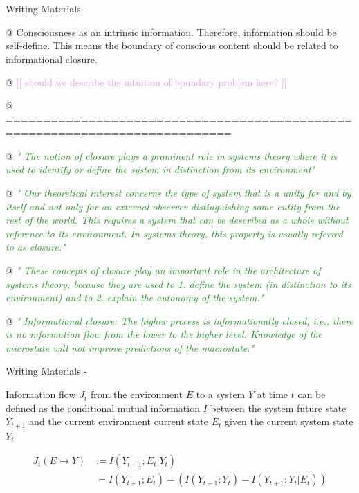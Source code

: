 \documentclass[utf8]{article}
\newenvironment{WritingMaterials} %
    	{
            \begin{tcolorbox}[enhanced,
                title=-,
                size=small,
                colbacktitle=Aquamarine,
                drop fuzzy shadow,
                fontupper=\small,
                boxrule=0.4pt,
                colback=Aquamarine!10!white,
                sharp corners]
                Writing Materials
            \end{tcolorbox}
            \begin{easylist}[itemize]
    	}
    	{
            \end{easylist}  
            \begin{tcolorbox}[enhanced,
                halign=flush right,
                halign title=right,
                size=small,
                colbacktitle=Aquamarine,
                drop fuzzy shadow,
                fontupper=\small,
                boxrule=0.4pt,
                colback=Aquamarine,
                colupper=White,
                sharp corners]
                Writing Materials -
            \end{tcolorbox}        
    	}
\newcommand{\rewrite}[1]{\textcolor{ForestGreen}{\textit{"#1"}}\newline}
\newcommand{\idea}[2][Plum]{\noindent
				\textcolor{#1}{[[ #2 ]]}}
\begin{document}
		\begin{WritingMaterials}
			@ Consciousness as an intrinsic information. Therefore, information should be self-define. This means the boundary of conscious content should be related to informational closure.

			@ \idea{should we describe the intuition of boundary problem here?}

			@ ============================================================================


			@ \rewrite{
				The notion of closure plays a prominent role in systems theory where it is used to identify or define the system in distinction from its environment} \cite{BERTSCHINGER.2006}

			@ \rewrite{
				Our theoretical interest concerns the type of system that is a unity for and by itself and not only for an external observer distinguishing some entity from the rest of the world. This requires a system that can be described as a whole without reference to its environment. In systems theory, this property is usually referred to as closure.}\citep{BERTSCHINGER.2006}

			@ \rewrite{
				These concepts of closure play an important role in the architecture of systems
				theory, because they are used to
				1. define the system (in distinction to its environment) and to
				2. explain the autonomy of the system.}\citep{BERTSCHINGER.2006}

			@ \rewrite{
				Informational closure: The higher process is informationally closed, i.e., there is no information flow from the lower to the higher level. Knowledge of the microstate will not improve predictions of the macrostate.} \citep[p. 4]{PFANTE.2014}


		\end{WritingMaterials}


			\noindent
			Information flow $J_{t}$ from the environment $E$ to a system $Y$ at time $t$ can be defined as the conditional mutual information $I$ between the system future state $Y_{t+1}$ and the current environment current state $E_{t}$ given the current system state $Y_{t}$

				\begin{equation}\label{eq:InformationFlow}
				\left.\begin{array}
				{rl}{J_{t}(E \rightarrow Y )} & {:= I(Y_{t+1};E_{t}|Y_{t})} \\
				{ } & { \ = I(Y_{t+1};E_{t}) - (I(Y_{t+1};Y_{t})-I(Y_{t+1};Y_{t}|E_{t}))}
				\end{array}\right.
				\end{equation}
\end{document}
